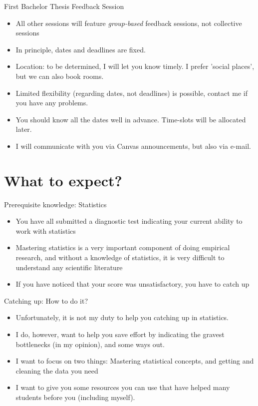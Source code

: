 \documentclass[aspectratio = 169, 12pt]{beamer}
\begin{document}
	\begin{frame}{First Bachelor Thesis Feedback Session}
	    \begin{itemize}
	        \item All other sessions will feature \textit{group-based} feedback sessions, not collective sessions
	        \item In principle, dates and deadlines are fixed. 
	        \item Location: to be determined, I will let you know timely. I prefer 'social places', but we can also book rooms. 
	        \item Limited flexibility (regarding dates, not deadlines) is possible, contact me if you have any problems.
	        \item You should know all the dates well in advance. Time-slots will be allocated later.
	        \item I will communicate with you via Canvas announcements, but also via e-mail. 
	    \end{itemize}
	\end{frame}

\section{What to expect?}
    
	\begin{frame}{Prerequisite knowledge: Statistics}
		\begin{itemize}
		    \item You have all submitted a diagnostic test indicating your current ability to work with statistics
		    \item Mastering statistics is a very important component of doing empirical research, and without a knowledge of statistics, it is very difficult to understand any scientific literature 
		    \item If you have noticed that your score was unsatisfactory, you have to catch up
		\end{itemize}
	\end{frame}
	
	\begin{frame}{Catching up: How to do it?}
	    \begin{itemize}
	        \item Unfortunately, it is not my duty to help you catching up in statistics. 
	        \item I do, however, want to help you save effort by indicating the gravest bottlenecks (in my opinion), and some ways out. 
	        \item I want to focus on two things: Mastering statistical concepts, and getting and cleaning the data you need
	        \item I want to give you some resources you can use that have helped many students before you (including myself).
	    \end{itemize}
	\end{frame}
	
\end{document}
